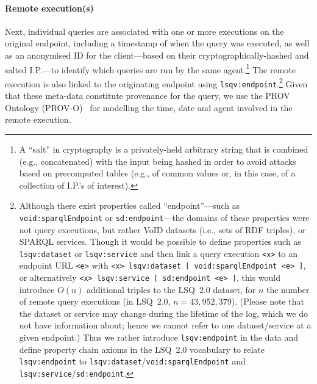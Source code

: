 \paragraph{Remote execution(s)} Next, individual queries are associated with one or more executions on the original endpoint, including a timestamp of when the query was executed, as well as an anonymised ID for the client---based on their cryptographically-hashed and salted I.P.---to identify which queries are run by the same agent.\footnote{A ``salt'' in cryptography is a privately-held arbitrary string that is combined (e.g., concatenated) with the input being hashed in order to avoid attacks based on precomputed tables (e.g., of common values or, in this case, of a collection of I.P.'s of interest).} The remote execution is also linked to the originating endpoint using \texttt{lsqv:endpoint}.\footnote{Although there exist properties called ``endpoint''---such as \texttt{void:sparqlEndpoint} or \texttt{sd:endpoint}---the domains of these properties were not query executions, but rather VoID datasets (i.e., sets of RDF triples), or SPARQL services. Though it would be possible to define properties such as \texttt{lsqv:dataset} or \texttt{lsqv:service} and then link a query execution \texttt{<x>} to an endpoint URL \texttt{<e>} with \texttt{<x> lsqv:dataset [ void:sparqlEndpoint <e> ]}, or alternatively \texttt{<x> lsqv:service [ sd:endpoint <e> ]}, this would introduce $O(n)$ additional triples to the LSQ~2.0 dataset, for $n$ the number of remote query executions (in LSQ~2.0, $n = 43,952,379$). (Please note that the dataset or service may change during the lifetime of the log, which we do not have information about; hence we cannot refer to one dataset/service at a given endpoint.) Thus we rather introduce \texttt{lsqv:endpoint} in the data and define property chain axioms in the LSQ~2.0 vocabulary to relate \texttt{lsqv:endpoint} to \texttt{lsqv:dataset}/\texttt{void:sparqlEndpoint} and \texttt{lsqv:service}/\texttt{sd:endpoint}.} Given that these meta-data constitute provenance for the query, we use the PROV Ontology (PROV-O)~\cite{prov-o} for modelling the time, date and agent involved in the remote execution.

